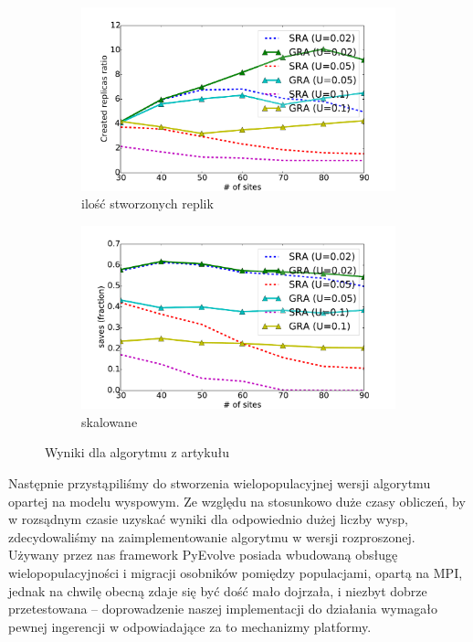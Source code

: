 \documentclass[11pt,pdftex,a4paper]{scrartcl}
\begin{document}
\begin{figure}[H]
    \centering
    \begin{subfigure}[b]{0.49\textwidth} 
        \includegraphics[width=\textwidth]{plots/replicas}
        \caption{ilość stworzonych replik}
    \end{subfigure}
    \begin{subfigure}[b]{0.49\textwidth}
        \includegraphics[width=\textwidth]{plots/saves}
        \caption{skalowane}
    \end{subfigure}

    \caption{Wyniki dla algorytmu z artykułu}
    \label{plot:original}
\end{figure}

Następnie przystąpiliśmy do stworzenia wielopopulacyjnej wersji algorytmu opartej na modelu wyspowym.
Ze względu na stosunkowo duże czasy obliczeń, by w rozsądnym czasie uzyskać wyniki dla odpowiednio
dużej liczby wysp, zdecydowaliśmy na zaimplementowanie algorytmu w wersji rozproszonej. Używany przez
nas framework PyEvolve posiada wbudowaną obsługę wielopopulacyjności i migracji osobników pomiędzy
populacjami, opartą na MPI, jednak na chwilę obecną zdaje się być dość mało dojrzała, i niezbyt dobrze
przetestowana -- doprowadzenie naszej implementacji do działania wymagało pewnej ingerencji w 
odpowiadające za to mechanizmy platformy. 
\end{document}

